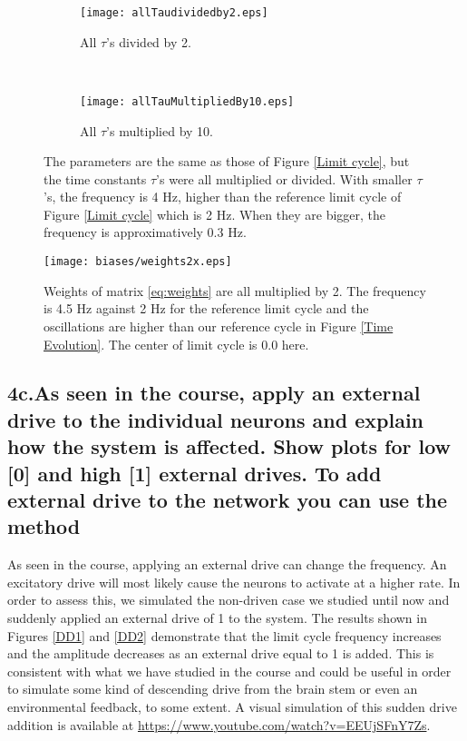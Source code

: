 \documentclass{cmc}
\begin{document}
\begin{figure}[H]
  \centering
  \begin{subfigure}[t]{0.5\textwidth}
  	\centering
  	\texttt{[image: allTaudividedby2.eps]}
    \caption{All $\tau$'s divided by 2.}
  \end{subfigure}
  ~
  \begin{subfigure}[t]{0.4\textwidth}
  	\centering

  	\texttt{[image: allTauMultipliedBy10.eps]}
    \caption{All $\tau$'s multiplied by 10.}
   \end{subfigure}
  \caption{The parameters are the same as those of Figure \ref{Limit cycle}, but the time constants $\tau$'s were all multiplied or divided. With smaller $\tau$'s, the frequency is 4 Hz, higher than the reference limit cycle of Figure \ref{Limit cycle} which is 2 Hz. When they are bigger, the frequency is approximatively 0.3 Hz. }
  \label{taus}
\end{figure}

\begin{figure}[H]
\centering
\texttt{[image: biases/weights2x.eps]}
\caption{Weights of matrix \ref{eq:weights} are all multiplied by 2. The frequency is 4.5 Hz against 2 Hz for the reference limit cycle and the oscillations are higher than our reference cycle in Figure \ref{Time Evolution}. The center of limit cycle is 0.0 here.}
\label{multiweight}
\end{figure}

\subsection*{4c.As seen in the course, apply an external drive to the
  individual neurons and explain how the system is affected. Show
  plots for low [0] and high [1] external drives. To add external
  drive to the network you can use the method \\
   }
\label{sec:4c}

As seen in the course, applying an external drive can change the frequency. An excitatory drive will most likely cause the neurons to activate at a higher rate. In order to assess this, we simulated the non-driven case we studied until now and suddenly applied an external drive of 1 to the system. The results shown in Figures \ref{DD1} and \ref{DD2} demonstrate that the limit cycle frequency increases and the amplitude decreases as an external drive equal to 1 is added. This is consistent with what we have studied in the course and could be useful in order to simulate some kind of descending drive from the brain stem or even an environmental feedback, to some extent. A visual simulation of this sudden drive addition is available at \url{https://www.youtube.com/watch?v=EEUjSFnY7Zs}.
\end{document}
